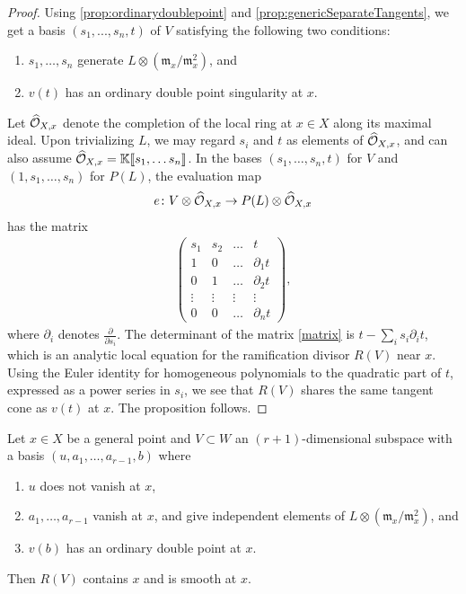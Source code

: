 \begin{proof}
  Using \autoref{prop:ordinarydoublepoint} and \autoref{prop:genericSeparateTangents}, we get a basis $(s_{1}, ..., s_{n}, t)$ of $V$ satisfying the following two conditions:
  \begin{enumerate}
      \item $s_{1}, \dots, s_{n}$ generate $L \otimes ({\mathfrak m}_{x}/{\mathfrak m}^{2}_{x})$, and
      \item $v(t)$ has an ordinary double point singularity at $x$.
    \end{enumerate}  

    Let $\widehat{\mathcal O}_{X,x}$ denote the completion of the local ring at $x \in X$ along its maximal ideal.  Upon trivializing $L$, we may regard $s_{i}$ and $t$ as elements of $\widehat{\mathcal O}_{X,x}$, and can also assume  $\widehat{\mathcal O}_{X,x} = \mathbb{K}\llbracket s_{1}, \dots s_{n}\rrbracket$.
    In the bases $(s_1, \dots, s_n, t)$ for $V$ and $(1, s_1, \dots, s_n)$ for $P(L)$, the evaluation map 
\begin{align*}
  e{\colon} V \otimes \widehat{\mathcal O}_{X,x} \to P(L) \otimes \widehat{\mathcal O}_{X,x}
\end{align*}
has the matrix
\begin{align}\label{matrix}
\begin{pmatrix}
  s_{1} & s_{2} & \dots & t \\
  1 & 0 & \dots & \partial_{1}t \\
  0 & 1 & \dots & \partial_{2}t \\
  \vdots & \vdots & \vdots & \vdots \\
  0 & 0 & \dots & \partial_{n}t
\end{pmatrix},
\end{align}
where $\partial_{i}$ denotes $\frac{\partial}{\partial s_{i}}$.
The determinant of the matrix \eqref{matrix} is   $t - \sum_{i}s_{i}\partial_{i}t$,
which is an analytic local equation for the ramification divisor $R(V)$ near $x$.
Using the Euler identity for homogeneous polynomials to the quadratic part of $t$, expressed as a power series in $s_i$, we see that $R(V)$ shares the same tangent cone as $v(t)$ at $x$.
The proposition follows.
\end{proof}

\begin{lemma}\label{lem:basepointfree}
  Let $x \in X$ be a general point and $V \subset W$ an $(r+1)$-dimensional subspace with a basis $(u, a_1,\dots, a_{r-1},b)$ where
  \begin{enumerate}
    \item $u$ does not vanish at $x$,
    \item $a_1, \dots , a_{r-1}$ vanish at $x$, and give independent elements of $L \otimes ({\mathfrak m}_{x}/{\mathfrak m}^{2}_{x})$, and
    \item $v(b)$ has an ordinary double point at $x$. 
  \end{enumerate}
  Then $R(V)$ contains $x$ and is smooth at $x$.
\end{lemma}

